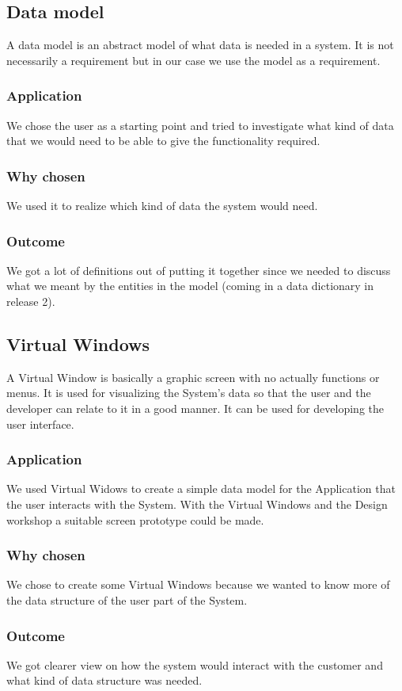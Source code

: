 \documentclass[a4paper]{article}
\begin{document}
		\subsection{Data model}
A data model is an abstract model of what data is needed in a system. It is not necessarily a requirement but in our case we use the model as a requirement.
	
		\subsubsection{Application}
		We chose the user as a starting point and tried to investigate what kind of data that we would need to be able to give the functionality required.
		\subsubsection{Why chosen}
		We used it to realize which kind of data the system would need.
		\subsubsection{Outcome}
	We got a lot of definitions out of putting it together since we needed to discuss what we meant by the entities in the model (coming in a data dictionary in release 2).

		\subsection{Virtual Windows}
			A Virtual Window is basically a graphic screen with no actually functions or menus. It is used for visualizing the System's data so that the user and the developer can relate to it in a good manner. It can be used for developing the user interface.
			\subsubsection{Application}
				We used Virtual Widows to create a simple data model for the Application that the user interacts with the System. With the Virtual Windows and the Design workshop a suitable screen prototype could be made.
			\subsubsection{Why chosen}
				We chose to create some Virtual Windows because we wanted to know more of the data structure of the user part of the System.
			\subsubsection{Outcome}
				We got clearer view on how the system would interact with the customer and what kind of data structure was needed.
\end{document}
